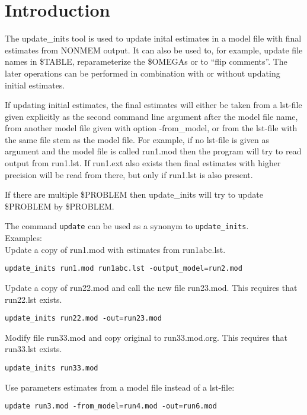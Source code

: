 
\setlength{\evensidemargin}{0pt}
\setlength{\oddsidemargin}{0pt}
\usepackage{hyperref}



\maketitle
\tableofcontents
\newpage

\section{Introduction}
The update\_inits tool is used to update inital estimates in a model file with final estimates from NONMEM output. It can also be used to, for example, update file names in \$TABLE, reparameterize the \$OMEGAs or to ``flip comments''. The later operations can be performed in combination with or without updating initial estimates.

If updating initial estimates, the final estimates will either be taken from a lst-file given explicitly as the second command line argument after the model file name, from another model file given with option -from\_model, or from the lst-file with the same file stem as the model file. For example, if no lst-file is given as argument and the model file is called run1.mod then the program will try to read output from run1.lst. If run1.ext also exists then final estimates with higher precision will be read from there, 
but only if run1.lst is also present.

If there are multiple \$PROBLEM then update\_inits will try to update \$PROBLEM by \$PROBLEM.

The command \verb|update| can be used as a synonym to \verb|update_inits|.\\

\noindent Examples:\\
Update a copy of run1.mod with estimates from run1abc.lst.
\begin{verbatim}
update_inits run1.mod run1abc.lst -output_model=run2.mod
\end{verbatim}
\newpage
Update a copy of run22.mod and call the new file run23.mod. This requires that run22.lst exists.
\begin{verbatim}
update_inits run22.mod -out=run23.mod
\end{verbatim}
Modify file run33.mod and copy original to run33.mod.org. This requires that run33.lst exists.
\begin{verbatim}
update_inits run33.mod
\end{verbatim}
Use parameters estimates from a model file instead of a lst-file:
\begin{verbatim}
update run3.mod -from_model=run4.mod -out=run6.mod
\end{verbatim}

